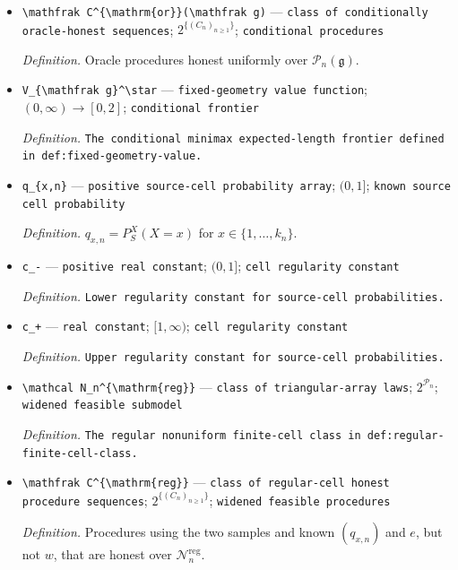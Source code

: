 \documentclass{article}
\begin{document}
\begin{itemize}
  \item \texttt{\textbackslash{}\allowbreak{}mathfrak C\textasciicircum{}\{\textbackslash{}\allowbreak{}mathrm\{or\}\allowbreak{}\}\allowbreak{}(\textbackslash{}\allowbreak{}mathfrak g)} --- \texttt{class of conditionally oracle-\allowbreak{}honest sequences}; \(2^{\{(C_n)_{n\ge1}\}}\); \texttt{conditional procedures}
  \par\smallskip\noindent\emph{Definition.} Oracle procedures honest uniformly over \(\mathcal P_n(\mathfrak g)\).
  \item \texttt{V\_\allowbreak{}\{\textbackslash{}\allowbreak{}mathfrak g\}\allowbreak{}\textasciicircum{}\textbackslash{}\allowbreak{}star} --- \texttt{fixed-\allowbreak{}geometry value function}; \((0,\infty)\to[0,2]\); \texttt{conditional frontier}
  \par\smallskip\noindent\emph{Definition.} \texttt{The conditional minimax expected-\allowbreak{}length frontier defined in def:\allowbreak{}fixed-\allowbreak{}geometry-\allowbreak{}value.}
  \item \texttt{q\_\allowbreak{}\{x,\allowbreak{}n\}\allowbreak{}} --- \texttt{positive source-\allowbreak{}cell probability array}; \((0,1]\); \texttt{known source cell probability}
  \par\smallskip\noindent\emph{Definition.} \(q_{x,n}=P_S^X(X=x)\) for \(x\in\{1,\ldots,k_n\}\).
  \item \texttt{c\_\allowbreak{}-\allowbreak{}} --- \texttt{positive real constant}; \((0,1]\); \texttt{cell regularity constant}
  \par\smallskip\noindent\emph{Definition.} \texttt{Lower regularity constant for source-\allowbreak{}cell probabilities.}
  \item \texttt{c\_\allowbreak{}+\allowbreak{}} --- \texttt{real constant}; \([1,\infty)\); \texttt{cell regularity constant}
  \par\smallskip\noindent\emph{Definition.} \texttt{Upper regularity constant for source-\allowbreak{}cell probabilities.}
  \item \texttt{\textbackslash{}\allowbreak{}mathcal N\_\allowbreak{}n\textasciicircum{}\{\textbackslash{}\allowbreak{}mathrm\{reg\}\allowbreak{}\}\allowbreak{}} --- \texttt{class of triangular-\allowbreak{}array laws}; \(2^{\mathcal P_n}\); \texttt{widened feasible submodel}
  \par\smallskip\noindent\emph{Definition.} \texttt{The regular nonuniform finite-\allowbreak{}cell class in def:\allowbreak{}regular-\allowbreak{}finite-\allowbreak{}cell-\allowbreak{}class.}
  \item \texttt{\textbackslash{}\allowbreak{}mathfrak C\textasciicircum{}\{\textbackslash{}\allowbreak{}mathrm\{reg\}\allowbreak{}\}\allowbreak{}} --- \texttt{class of regular-\allowbreak{}cell honest procedure sequences}; \(2^{\{(C_n)_{n\ge1}\}}\); \texttt{widened feasible procedures}
  \par\smallskip\noindent\emph{Definition.} Procedures using the two samples and known \((q_{x,n})\) and \(e\), but not \(w\), that are honest over \(\mathcal N_n^{\mathrm{reg}}\).
\end{itemize}
\end{document}
